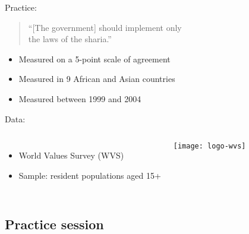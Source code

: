 \documentclass[t]{beamer}
\begin{document}
	\begin{frame}[t]{Practice: }

		\begin{quote}
		``[The government] should implement only \\
		the laws of the sharia.''\\[1em]
		\end{quote}
		
		\begin{itemize}
			\item Measured on a 5-point scale of agreement
			\item Measured in 9 African and Asian countries
			\item Measured between 1999 and 2004
		\end{itemize}

		\vspace{1em}
		
    Data:
	
			\begin{columns}[c]
				
				\begin{itemize}
					\item World Values Survey (WVS)
					\item Sample: resident populations aged 15+
				\end{itemize}
	
				\texttt{[image: logo-wvs]}
			\end{columns}
	
	\end{frame}

	\subsection{Practice session}
  
\end{document}
